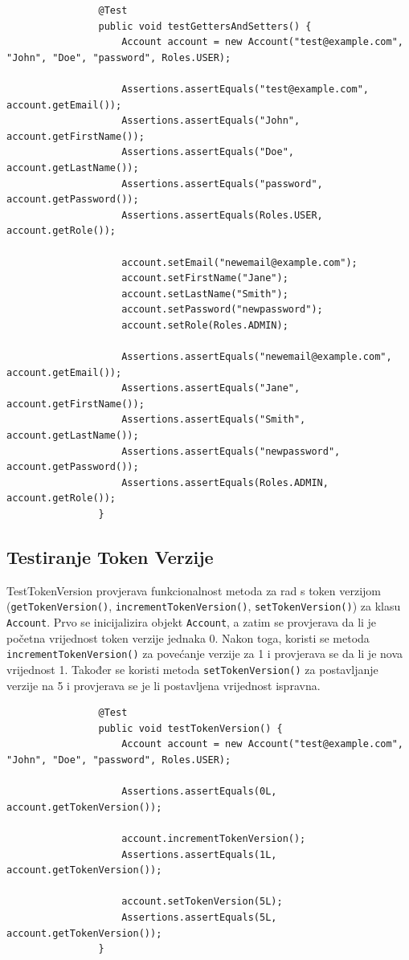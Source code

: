 			\begin{lstlisting}
				@Test
				public void testGettersAndSetters() {
					Account account = new Account("test@example.com", "John", "Doe", "password", Roles.USER);
			
					Assertions.assertEquals("test@example.com", account.getEmail());
					Assertions.assertEquals("John", account.getFirstName());
					Assertions.assertEquals("Doe", account.getLastName());
					Assertions.assertEquals("password", account.getPassword());
					Assertions.assertEquals(Roles.USER, account.getRole());
			
					account.setEmail("newemail@example.com");
					account.setFirstName("Jane");
					account.setLastName("Smith");
					account.setPassword("newpassword");
					account.setRole(Roles.ADMIN);
			
					Assertions.assertEquals("newemail@example.com", account.getEmail());
					Assertions.assertEquals("Jane", account.getFirstName());
					Assertions.assertEquals("Smith", account.getLastName());
					Assertions.assertEquals("newpassword", account.getPassword());
					Assertions.assertEquals(Roles.ADMIN, account.getRole());
				}
			\end{lstlisting}

			\subsection{Testiranje Token Verzije}
			
			TestTokenVersion provjerava funkcionalnost metoda za rad s token verzijom (\texttt{getTokenVersion()}, \texttt{incrementTokenVersion()}, \texttt{setTokenVersion()}) za klasu \texttt{Account}. Prvo se inicijalizira objekt \texttt{Account}, a zatim se provjerava da li je početna vrijednost token verzije jednaka 0. Nakon toga, koristi se metoda \texttt{incrementTokenVersion()} za povećanje verzije za 1 i provjerava se da li je nova vrijednost 1. Također se koristi metoda \texttt{setTokenVersion()} za postavljanje verzije na 5 i provjerava se je li postavljena vrijednost ispravna.

			\begin{lstlisting}
				@Test
				public void testTokenVersion() {
					Account account = new Account("test@example.com", "John", "Doe", "password", Roles.USER);
			
					Assertions.assertEquals(0L, account.getTokenVersion());
			
					account.incrementTokenVersion();
					Assertions.assertEquals(1L, account.getTokenVersion());
			
					account.setTokenVersion(5L);
					Assertions.assertEquals(5L, account.getTokenVersion());
				}
			\end{lstlisting}

